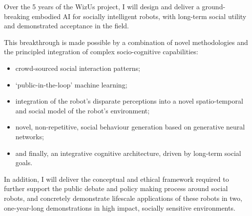 \documentclass[11pt,a4paper]{report}
\newcommand{\project}{WizUs\xspace}
\begin{document}



%
%

Over the 5 years of the \project project, I will design and deliver a ground-breaking
embodied AI for socially intelligent robots, with long-term social utility
and demonstrated acceptance in the field.

This breakthrough is made possible by a combination of novel methodologies and
the principled integration of complex socio-cognitive capabilities:

\begin{itemize}
        \item crowd-sourced social interaction patterns;
        \item `public-in-the-loop' machine learning;
        \item integration of the robot's disparate perceptions into a novel
            spatio-temporal and social model of the robot's environment;
        \item novel, non-repetitive, social behaviour generation based on
            generative neural networks;
        \item and finally, an integrative cognitive architecture, driven by
            long-term social goals.
\end{itemize}

In addition, I will deliver the conceptual and ethical framework required to
further support the public debate and policy making process around social
robots, and concretely demonstrate lifescale applications of these robots in
two, one-year-long demonstrations in high impact, socially sensitive environments.
\end{document}
